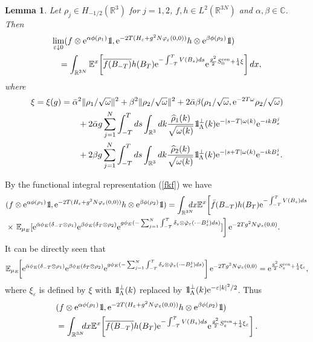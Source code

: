 \documentclass[12pt]{article}
\newtheorem{lemma}[theorem]{Lemma}
\newcommand{\bl}[1]{\begin{lemma}\label{#1}}
\newcommand{\el}{\end{lemma}}
\def\bbbone{{\mathchoice {\rm 1\mskip-4mu l} {\rm 1\mskip-4mu l}
{\rm 1\mskip-4.5mu l} {\rm 1\mskip-5mu l}}}
\def\one{\bbbone}
\newcommand{\kp}{\one_\Lambda^\perp(k)}
\newcommand{\Ebb}{{\mathbb E}}
\providecommand{\BR}{{\mathbb{R}^3 }}
\providecommand{\BRN}{{\mathbb{R}^{3N} }}
\providecommand{\CC}{{\mathbb{C}}}
\providecommand{\kak}[1]{(\ref{#1})}
\providecommand{\LRN}{{L^2(\BRN)}}
\providecommand{\hn}{H}%
\providecommand{\ov}[1]{\overline{#1}}
\providecommand{\han}{{1/2}}
\providecommand{\non}{\nonumber}
\providecommand{\e}{{\rm e}}
\providecommand{\1}{\mathbb{1}}
\providecommand{\eps}{\varepsilon}
\providecommand{\ren}{{\rm ren}}
\begin{document}
\bl{h123}
Let $ \rho_j\in H_{-\han}(\BR)$ for $j=1,2$, $f,h\in\LRN$ and $\alpha,\beta\in\CC$. Then
\begin{eqnarray}
\lefteqn{
\lim_{\eps\downarrow0} (f\otimes \e^{\alpha\phi(\rho_1)}\one,
\e^{-2T(\hn_\eps+g^2N\varphi_\eps(0,0))} h\otimes  \e^{\beta\phi(\rho_2)}\one) } \non\\
&&\label{main22}
= \int_{\BRN} \Ebb^x\!\left[\ov{f(B_{-T})} h(B_T)\e^{-\int_{-T}^T V(B_s) ds} \e^{\frac{g^2}{2}
S_0^\ren +\frac{1}{4}\xi} \right]dx,
\end{eqnarray}
where
\begin{align*}
\xi=\xi(g)
&=
\bar \alpha^2\|\rho_1/\sqrt\omega \|^2+\beta^2\|\rho_2/\sqrt\omega\|^2+2\bar
\alpha \beta (\rho_1/\sqrt\omega, \e^{-2T\omega} \rho_2/\sqrt\omega) \\
&
\qquad + 2\bar \alpha g \sum_{j=1}^N
\int_{-T}^Tds \int_\BR dk \frac{\widehat \rho_1(k)}{\sqrt{\omega(k)}}\kp
\e^{-|s-T|\omega(k)}\e^{-ikB_s^j} \\
&
\qquad
+ 2\beta  g
\sum_{j=1}^N
\int_{-T}^Tds \int_\BR dk \frac{\widehat \rho_2(k)}{\sqrt{\omega(k)}}\kp
\e^{-|s+T|\omega(k)}\e^{-ikB_s^j}.
\end{align*}
\el
\proof
By the functional integral representation \kak{fkf} we have
\begin{align*}
&
(f\otimes \e^{\alpha\phi(\rho_1)}\one,
\e^{-2T(\hn_\eps+g^2N \varphi_\eps(0,0))} h\otimes
\e^{\beta\phi(\rho_2)}\one)
=
\int_{\BRN} \!\!\!\!\!  dx  \Ebb^x\!\left[\bar f(B_{-T} )h(B_T) \e^{-\int_{-T}^TV(B_s) ds}\right.\\
&\times
\left.
\Ebb_{\mu_E}[\e^{\bar \alpha\phi_E(\delta_{-T}\otimes \rho_1)}
\e^{\beta \phi_E(\delta_{T}\otimes \rho_2)} \e^{g \phi_E(-\sum_{j=1}^N
\int_{-T}^ T \delta_s\otimes  \tilde \varphi_\eps (\cdot-B_s^j)ds)} ]\right]
\e^{-2Tg^2 N\varphi_\eps(0,0)}.
\end{align*}
It can be
directly seen that
$$
\Ebb_{\mu_E}\!\!\left[\e^{\bar \alpha\phi_E(\delta_{-T}\otimes \rho_1)}
\e^{\beta \phi_E(\delta_{T}\otimes \rho_2)}\e^{g \phi_E(-\sum_{j=1}^N
\int_{-T}^ T \delta_s\otimes  \tilde \varphi_\eps (\cdot-B_s^j)ds)} \right]
\e^{-2Tg^2 N\varphi_\eps(0,0)} =\e^{\frac{g^2}{2}S_\eps^\ren +\frac{1}{4}\xi_\eps},
$$
where $\xi_\eps$ is defined by $\xi$ with $\kp$ replaced by $\kp \e^{-\eps|k|^2/2}$. Thus
\begin{align*}
& (f\otimes \e^{\alpha\phi(\rho_1)}\one, \e^{-2T(\hn_\eps+g^2N\varphi_\eps(0,0))}
h\otimes  \e^{\beta\phi(\rho_2)}\one) \\
&
= \int_{\BRN} \!\!\! dx \Ebb^x\!\left[\ov{f(B_{-T})} h(B_T)\e^{-\int_{-T}^T V(B_s) ds} \e^{\frac{g^2}{2}
S_\eps^\ren +\frac{1}{4}\xi_\eps} \right].
\end{align*}
\end{document}
